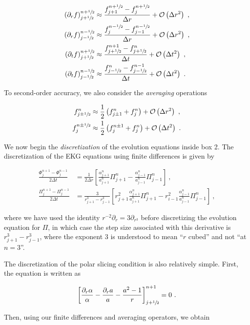 \documentclass[a4paper,11pt]{article}
\renewcommand{\a}{\alpha}
\newcommand{\pd}{\partial}
\newcommand{\dt}{\Delta t}
\newcommand{\dr}{\Delta r}
\newcommand{\order}[2]{\mathcal{O}\lrpar{#1^{#2}}}
\newcommand{\lrpar}[1]{\left( #1 \right)}
\newcommand{\lrsquare}[1]{\left[ #1 \right]}
\newcommand{\n}{\noindent}
\newcommand{\eq}[1]{
  \begin{equation}
    #1
  \end{equation}
}
\newcommand{\spl}[1]{
  \begin{split}
    #1
  \end{split}
}
\newcommand{\al}[1]{
  \begin{align}
    #1
  \end{align}
}
\begin{document}
\eq{
  \spl{
    \lrpar{\pd_{r}f}^{n+\sfrac{1}{2}}_{j+\sfrac{1}{2}} &\approx \frac{f^{n+\sfrac{1}{2}}_{j+1} - f^{n+\sfrac{1}{2}}_{j}}{\dr} + \order{\dr}{2}\ ,\\
    \lrpar{\pd_{r}f}^{n-\sfrac{1}{2}}_{j-\sfrac{1}{2}} &\approx \frac{f^{n-\sfrac{1}{2}}_{j} - f^{n-\sfrac{1}{2}}_{j-1}}{\dr} + \order{\dr}{2}\ ,\\
    \lrpar{\pd_{t}f}^{n+\sfrac{1}{2}}_{j+\sfrac{1}{2}} &\approx \frac{f^{n+1}_{j+\sfrac{1}{2}} - f^{n}_{j+\sfrac{1}{2}}}{\dt} + \order{\dt}{2}\ ,\\
    \lrpar{\pd_{t}f}^{n-\sfrac{1}{2}}_{j-\sfrac{1}{2}} &\approx \frac{f^{n}_{j-\sfrac{1}{2}} - f^{n-1}_{j-\sfrac{1}{2}}}{\dt} + \order{\dt}{2}\ .
  }
}

To second-order accuracy, we also consider the \emph{averaging} operations

\eq{
  \spl{
    f^{n}_{j\pm\sfrac{1}{2}} &\approx \frac{1}{2}\lrpar{f^{n}_{j\pm1} + f^{n}_{j}} + \order{\dr}{2}\ ,\\
    f^{n\pm\sfrac{1}{2}}_{j} &\approx \frac{1}{2}\lrpar{f^{n\pm1}_{j} + f^{n}_{j}} + \order{\dt}{2}\ .
  }
}

We now begin the \emph{discretization} of the evolution equations inside box 2. The discretization of the EKG equations using finite differences is given by

\al{
  \frac{\Phi^{n+1}_{j} - \Phi^{n-1}_{j}}{2\dt} &= \frac{1}{2\dr}\lrsquare{\frac{\a^{n}_{j+1}}{a^{n}_{j+1}}\Pi^{n}_{j+1} - \frac{\a^{n}_{j-1}}{a^{n}_{j-1}}\Pi^{n}_{j-1}}\ ,\\
  \frac{\Pi^{n+1}_{j}  - \Pi^{n-1}_{j}}{2\dt}  &= \frac{3}{r_{j+1}^{3} - r_{j-1}^{3}}\lrsquare{r^{2}_{j+1}\frac{\a^{n}_{j+1}}{a^{n}_{j+1}}\Pi^{n}_{j+1} - r^{2}_{i-1}\frac{\a^{n}_{j-1}}{a^{n}_{j-1}}\Pi^{n}_{j-1}}\ ,
}

\noindent where we have used the identity $r^{-2}\pd_{r} = 3\pd_{r^{3}}$ before discretizing the evolution equation for $\Pi$, in which case the step size associated with this derivative is $r^{3}_{j+1} - r^{3}_{j-1}$, where the exponent $3$ is understood to mean ``$r$ cubed'' and not ``at $n=3$''.

The discretization of the polar slicing condition is also relatively simple. First, the equation is written as

\eq{ \lrsquare{\frac{\pd_{r}\a}{\a} - \frac{\pd_{r}a}{a} - \frac{a^{2}-1}{r}}^{n+1}_{j+\sfrac{1}{2}} = 0\ .}

\n Then, using our finite differences and averaging operators, we obtain
\end{document}
